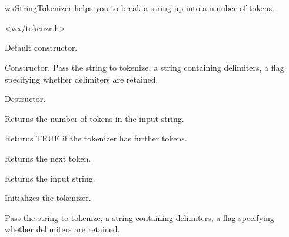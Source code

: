 \section{}\label{wxstringtokenizer}

wxStringTokenizer helps you to break a string up into a number of tokens.




<wx/tokenzr.h>


\label{wxstringtokenizerwxstringtokenizer}


Default constructor.


Constructor. Pass the string to tokenize, a string containing delimiters,
a flag specifying whether delimiters are retained.

\label{wxstringtokenizerdtor}


Destructor.

\label{wxstringtokenizercounttokens}


Returns the number of tokens in the input string.

\label{wxstringtokenizerhasmoretokens}


Returns TRUE if the tokenizer has further tokens.

\label{wxstringtokenizergetnexttoken}


Returns the next token.

\label{wxstringtokenizergetstring}


Returns the input string.

\label{wxstringtokenizersetstring}


Initializes the tokenizer.

Pass the string to tokenize, a string containing delimiters,
a flag specifying whether delimiters are retained.

